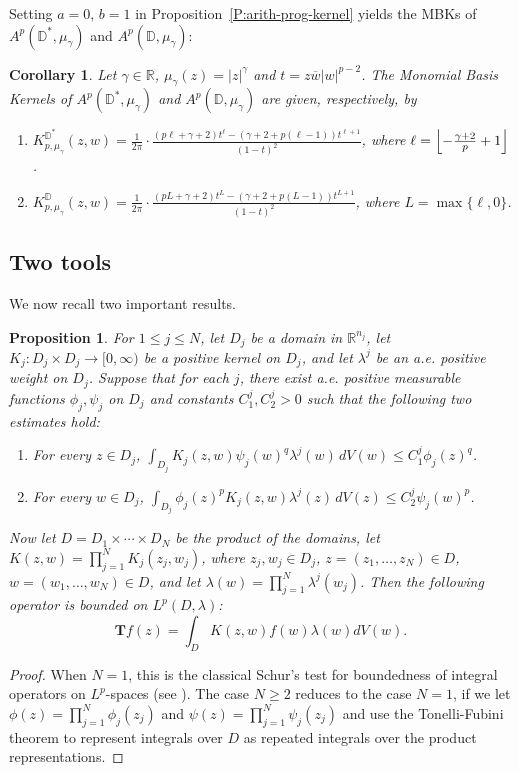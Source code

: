\documentclass[letterpaper,11pt,reqno]{amsart}
\theoremstyle{plain}
\newtheorem{proposition}[equation]{Proposition}
\newtheorem{corollary}[equation]{Corollary}
\theoremstyle{definition}
\theoremstyle{remark}
\theoremstyle{remark}
\numberwithin{equation}{section}
\newcommand{\abs}[1]{\left\vert#1\right\vert}
\newcommand{\ol}{\overline}
\newcommand{\mug}{{\mu_{\gamma}}}
\newcommand{\rl}{\mathbb R}
\newcommand{\D}{{\mathbb D}}
\newcommand{\R}{{\mathbb R}}
\DeclarePairedDelimiter\floor{\lfloor}{\rfloor}
\begin{document}
Setting $a=0, \,b=1$ in Proposition~\ref{P:arith-prog-kernel} yields the  MBKs of $A^p(\D^*,\mug)$ and $A^p(\D,\mug)$:

\begin{corollary}\label{C:MBK-calculation-(punctured)disc}
Let $\gamma \in \R$, $\mug(z)=\abs{z}^\gamma$ and $t= z\ol{w}\abs{w}^{p-2}$.  The Monomial Basis Kernels of $A^p(\D^*,\mug)$ and $A^p(\D,\mug)$ are given, respectively, by 
\begin{enumerate}[wide]
\item $\displaystyle{K^{\D^*}_{p,\mug}(z,w)=  \frac{1}{2\pi} \cdot \frac{(p\ell+\gamma+2)t^\ell- (\gamma+2 +p(\ell-1))t^{\ell+1} }{(1-t)^2}}$, where $\ell = \floor*{-\frac{\gamma+2}{p}+1}$. \label{E:MBK-formula-punctured-disc1}
\item $\displaystyle{K^{\D}_{p,\mug}(z,w)=  \frac{1}{2\pi} \cdot \frac{(pL+\gamma+2)t^L- (\gamma+2 +p(L-1))t^{L+1} }{(1-t)^2}}$, where $L  = \max\{\ell,0\}$. \label{E:MBK-formula-punctured-disc2}
\end{enumerate}
\end{corollary}

\subsection{Two tools}
We now recall two important results.

\begin{proposition}\label{P:Schurs-test}
For $1 \leq j \leq N$, let $D_j$ be a domain in $\rl^{n_j}$, let $K_j:D_j\times D_j \to [0,\infty)$ be a positive kernel on $D_j$, and let $\lambda^j$ be an a.e. positive weight on $D_j$. 
Suppose that for each $j$, there exist a.e. positive measurable functions $\phi_j, \psi_j$ on $D_j$ and constants $C_1^{j}, C_2^{j} > 0$ such that the following two estimates hold:
\begin{enumerate}[wide]
\item For every $z \in D_j$, $\displaystyle{\int_{D_j} K_j(z,w) \psi_j(w)^q \lambda^j(w)\, dV(w) \le C_1^j \phi_j(z)^q}$.
\item For every $w \in D_j$, $\displaystyle{\int_{D_j} \phi_j(z)^pK_j(z,w)  \lambda^j(z)\, dV(z) \le C_2^j \psi_j(w)^p}$.
\end{enumerate}

Now let $D = D_1 \times \cdots \times D_N$ be the product of the domains, let $K(z,w) = \prod_{j=1}^N K_j(z_j,w_j)$, where $z_j, w_j\in D_j$, $z=(z_1,\dots, z_N)\in D$, $w=(w_1, \dots, w_N)\in D$, and  let $\lambda(w) = \prod_{j=1}^N \lambda^j(w_j)$.
Then the following operator is bounded on $L^p(D,\lambda)$:
\[
\bm{T}f(z) = \int_D K(z,w) f(w) \lambda(w) dV(w).
\]
\end{proposition}
\begin{proof}
When $N=1$, this is the classical Schur's test for boundedness of integral operators on $L^p$-spaces (see \cite[Theorem~3.6]{zhubook}). 
The case $N \geq 2$ reduces to the case $N=1$, if we let $\phi(z) = \prod_{j=1}^N \phi_j(z_j)$ and $\psi(z) = \prod_{j=1}^N \psi_j(z_j)$ and use the Tonelli-Fubini theorem to represent integrals over $D$ as repeated integrals over the product representations.
\end{proof}
\end{document}
